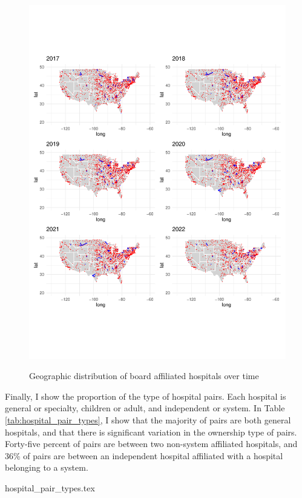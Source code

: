 \documentclass[12pt]{article}
\begin{document}
    \begin{figure}[ht!]
        \centering
        \caption{Geographic distribution of board affiliated hospitals over time}
        \includegraphics[width=\textwidth]{Objects/connected_maps.pdf}
        \label{fig:connected_maps}
    \end{figure}

    Finally, I show the proportion of the type of hospital pairs. Each hospital is general or specialty, children or adult, and independent or system. In Table \ref{tab:hospital_pair_types}, I show that the majority of pairs are both general hospitals, and that there is significant variation in the ownership type of pairs. Forty-five percent of pairs are between two non-system affiliated hospitals, and 36\% of pairs are between an independent hospital affiliated with a hospital belonging to a system. 

    {hospital_pair_types.tex}
\end{document}
